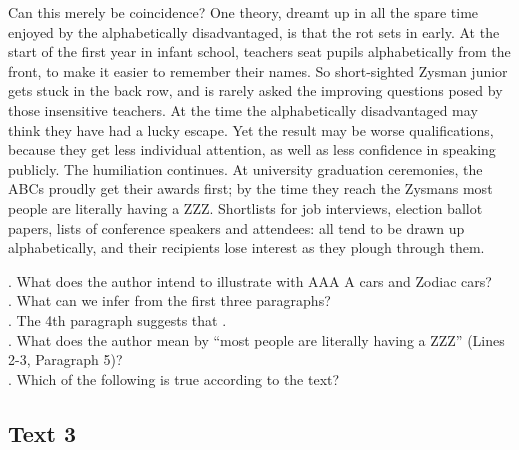 Can this merely be coincidence? One theory, dreamt up in all the spare time enjoyed by the alphabetically disadvantaged, is that the rot sets in early. At the start of the first year in infant school, teachers seat pupils alphabetically from the front, to make it easier to remember their names. So short-sighted Zysman junior gets stuck in the back row, and is rarely asked the improving questions posed by those insensitive teachers. At the time the alphabetically disadvantaged may think they have had a lucky escape. Yet the result may be worse qualifications, because they get less individual attention, as well as less confidence in speaking publicly.
The humiliation continues. At university graduation ceremonies, the ABCs proudly get their awards first; by the time they reach the Zysmans most people are literally having a ZZZ. Shortlists for job interviews, election ballot papers, lists of conference speakers and attendees: all tend to be drawn up alphabetically, and their recipients lose interest as they plough through them.
\begin{questions}  .	What does the author intend to illustrate with AAA A cars and Zodiac cars?\\
 .	What can we infer from the first three paragraphs? \\
 .	The 4th paragraph suggests that \ltk{}.\\
 .	What does the author mean by “most people are literally having a ZZZ” (Lines 2-3, Paragraph 5)?\\
 .	Which of the following is true according to the text?\\
\end{questions}    \subsection{Text 3}
